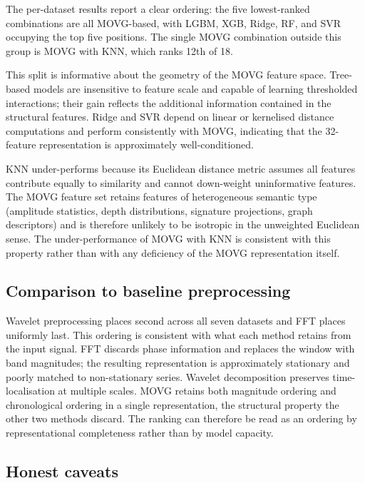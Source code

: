 \documentclass[a4paper,12pt]{article}
\begin{document}
The per-dataset results report a clear ordering: the five lowest-ranked combinations are all MOVG-based, with LGBM, XGB, Ridge, RF, and SVR occupying the top five positions. The single MOVG combination outside this group is MOVG with KNN, which ranks 12th of 18.

This split is informative about the geometry of the MOVG feature space. Tree-based models are insensitive to feature scale and capable of learning thresholded interactions; their gain reflects the additional information contained in the structural features. Ridge and SVR depend on linear or kernelised distance computations and perform consistently with MOVG, indicating that the 32-feature representation is approximately well-conditioned.

KNN under-performs because its Euclidean distance metric assumes all features contribute equally to similarity and cannot down-weight uninformative features. The MOVG feature set retains features of heterogeneous semantic type (amplitude statistics, depth distributions, signature projections, graph descriptors) and is therefore unlikely to be isotropic in the unweighted Euclidean sense. The under-performance of MOVG with KNN is consistent with this property rather than with any deficiency of the MOVG representation itself.

\subsection{Comparison to baseline preprocessing}
\label{sec:disc_baselines}

Wavelet preprocessing places second across all seven datasets and FFT places uniformly last. This ordering is consistent with what each method retains from the input signal. FFT discards phase information and replaces the window with band magnitudes; the resulting representation is approximately stationary and poorly matched to non-stationary series. Wavelet decomposition preserves time-localisation at multiple scales. MOVG retains both magnitude ordering and chronological ordering in a single representation, the structural property the other two methods discard. The ranking can therefore be read as an ordering by representational completeness rather than by model capacity.

\subsection{Honest caveats}
\label{sec:disc_caveats}
\end{document}
